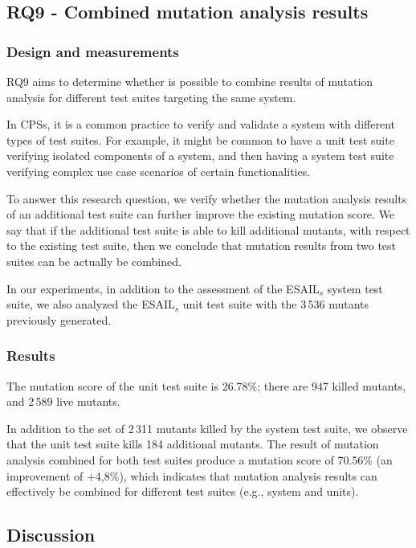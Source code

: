 \clearpage
\subsection{RQ9 - Combined mutation analysis results}
\label{sec:exp:thr}

\STARTCHANGEDWPT
\subsubsection{Design and measurements}


RQ9 aims to determine whether is possible to combine results of mutation analysis for different test suites targeting the same system.

In CPSs, it is a common practice to verify and validate a system with different types of test suites. For example, it might be common to have a unit test suite verifying isolated components of a system, and then having a system test suite verifying complex use case scenarios of certain functionalities.

To answer this research question, we verify whether the mutation analysis results of an additional test suite can further improve the existing mutation score. We say that if the additional test suite is able to kill additional mutants, with respect to the existing test suite, then we conclude that mutation results from two test suites can be actually be combined.

In our experiments, in addition to the assessment of the ESAIL$_s$ system test suite, we also analyzed the ESAIL$_s$ unit test suite with the 3\,536 mutants previously generated.

\subsubsection{Results}

The mutation score of the unit test suite is 26.78\%; there are 947 killed mutants, and 2\,589 live mutants.

In addition to the set of 2\,311 mutants killed by the system test suite, we observe that the unit test suite kills 184 additional mutants.
The result of mutation analysis combined for both test suites produce a mutation score of 70.56\% (an improvement of +4,8\%), which indicates that mutation analysis results can effectively be combined for different test suites (e.g., system and units).

\ENDCHANGEDWPT

\subsection{Discussion}
\label{sec:emp:discussion}

